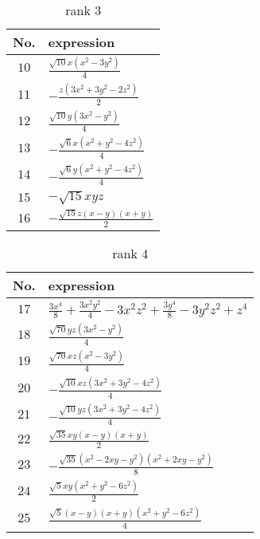 \documentclass[fleqn,8pt,landscape]{jsarticle}
\begin{document}
\begin{table}[ht!]
\begin{center}
\caption{rank 3}
\renewcommand{\arraystretch}{1.3}
\begin{tabular}{cl} \hline \hline
No. & expression \\ \hline
$ 10 $ & $ \frac{\sqrt{10} x \left(x^{2} - 3 y^{2}\right)}{4} $ \\
$ 11 $ & $ - \frac{z \left(3 x^{2} + 3 y^{2} - 2 z^{2}\right)}{2} $ \\
$ 12 $ & $ \frac{\sqrt{10} y \left(3 x^{2} - y^{2}\right)}{4} $ \\
$ 13 $ & $ - \frac{\sqrt{6} x \left(x^{2} + y^{2} - 4 z^{2}\right)}{4} $ \\
$ 14 $ & $ - \frac{\sqrt{6} y \left(x^{2} + y^{2} - 4 z^{2}\right)}{4} $ \\
$ 15 $ & $ - \sqrt{15} x y z $ \\
$ 16 $ & $ - \frac{\sqrt{15} z \left(x - y\right) \left(x + y\right)}{2} $ \\
 \hline \hline
\end{tabular}
\end{center}
\end{table}
\begin{table}[ht!]
\begin{center}
\caption{rank 4}
\renewcommand{\arraystretch}{1.3}
\begin{tabular}{cl} \hline \hline
No. & expression \\ \hline
$ 17 $ & $ \frac{3 x^{4}}{8} + \frac{3 x^{2} y^{2}}{4} - 3 x^{2} z^{2} + \frac{3 y^{4}}{8} - 3 y^{2} z^{2} + z^{4} $ \\
$ 18 $ & $ \frac{\sqrt{70} y z \left(3 x^{2} - y^{2}\right)}{4} $ \\
$ 19 $ & $ \frac{\sqrt{70} x z \left(x^{2} - 3 y^{2}\right)}{4} $ \\
$ 20 $ & $ - \frac{\sqrt{10} x z \left(3 x^{2} + 3 y^{2} - 4 z^{2}\right)}{4} $ \\
$ 21 $ & $ - \frac{\sqrt{10} y z \left(3 x^{2} + 3 y^{2} - 4 z^{2}\right)}{4} $ \\
$ 22 $ & $ \frac{\sqrt{35} x y \left(x - y\right) \left(x + y\right)}{2} $ \\
$ 23 $ & $ - \frac{\sqrt{35} \left(x^{2} - 2 x y - y^{2}\right) \left(x^{2} + 2 x y - y^{2}\right)}{8} $ \\
$ 24 $ & $ \frac{\sqrt{5} x y \left(x^{2} + y^{2} - 6 z^{2}\right)}{2} $ \\
$ 25 $ & $ \frac{\sqrt{5} \left(x - y\right) \left(x + y\right) \left(x^{2} + y^{2} - 6 z^{2}\right)}{4} $ \\
 \hline \hline
\end{tabular}
\end{center}
\end{table}
\end{document}
